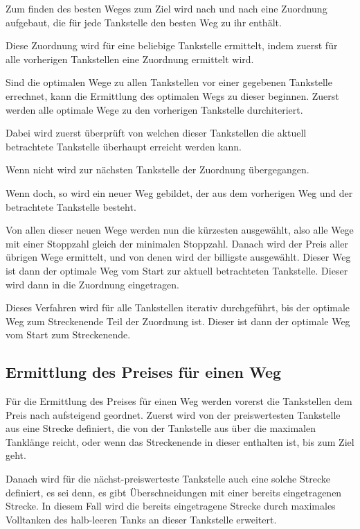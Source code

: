 \documentclass[a4paper,10pt,ngerman]{scrartcl}
\begin{document}
Zum finden des besten Weges zum Ziel wird nach und nach eine Zuordnung aufgebaut, die für jede Tankstelle den besten Weg zu ihr enthält.

Diese Zuordnung wird für eine beliebige Tankstelle ermittelt, indem zuerst für alle vorherigen Tankstellen eine Zuordnung ermittelt wird.

Sind die optimalen Wege zu allen Tankstellen vor einer gegebenen Tankstelle errechnet, kann die Ermittlung des optimalen Wegs zu dieser beginnen.
Zuerst werden alle optimale Wege zu den vorherigen Tankstelle durchiteriert.
 
Dabei wird zuerst überprüft von welchen dieser Tankstellen die aktuell betrachtete Tankstelle überhaupt erreicht werden kann.

Wenn nicht wird zur nächsten Tankstelle der Zuordnung übergegangen.

Wenn doch, so wird ein neuer Weg gebildet, der aus dem vorherigen Weg und der betrachtete Tankstelle besteht.

Von allen dieser neuen Wege werden nun die kürzesten ausgewählt, also alle Wege mit einer Stoppzahl gleich der minimalen Stoppzahl.
Danach wird der Preis aller übrigen Wege ermittelt, und von denen wird der billigste ausgewählt.
Dieser Weg ist dann der optimale Weg vom Start zur aktuell betrachteten Tankstelle.
Dieser wird dann in die Zuordnung eingetragen.

Dieses Verfahren wird für alle Tankstellen iterativ durchgeführt, bis der optimale Weg zum Streckenende Teil der Zuordnung ist.
Dieser ist dann der optimale Weg vom Start zum Streckenende.

\subsection{Ermittlung des Preises für einen Weg}

Für die Ermittlung des Preises für einen Weg werden vorerst die Tankstellen dem Preis nach aufsteigend geordnet.
Zuerst wird von der preiswertesten Tankstelle aus eine Strecke definiert, die von der Tankstelle aus über die maximalen Tanklänge reicht, oder wenn das Streckenende in dieser enthalten ist, bis zum Ziel geht.

Danach wird für die nächst-preiswerteste Tankstelle auch eine solche Strecke definiert, es sei denn, es gibt Überschneidungen mit einer bereits eingetragenen Strecke.
In diesem Fall wird die bereits eingetragene Strecke durch maximales Volltanken des halb-leeren Tanks an dieser Tankstelle erweitert.
\end{document}
